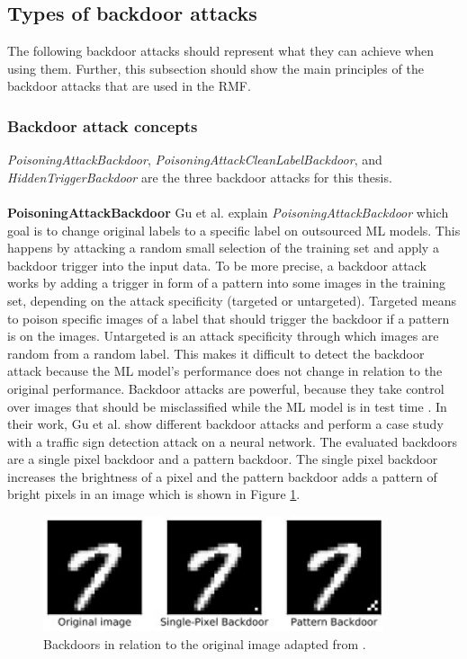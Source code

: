 \subsection{Types of backdoor attacks}
\label{sec:backdoor_types}

The following backdoor attacks should represent what they can achieve when using them. Further, this subsection should show the main principles of the backdoor attacks that are used in the RMF.

\subsubsection*{Backdoor attack concepts}

\textit{PoisoningAttackBackdoor}, \textit{PoisoningAttackCleanLabelBackdoor}, and \textit{HiddenTriggerBackdoor} are the three backdoor attacks for this thesis. \\ \\
\textbf{PoisoningAttackBackdoor} Gu et al. \cite{DBLP:journals/corr/abs-1708-06733} explain \textit{PoisoningAttackBackdoor} which goal is to change original labels to a specific label on outsourced ML models. This happens by attacking a random small selection of the training set and apply a backdoor trigger into the input data. To be more precise, a backdoor attack works by adding a trigger in form of a pattern into some images in the training set, depending on the attack specificity (targeted or untargeted). Targeted means to poison specific images of a label that should trigger the backdoor if a pattern is on the images. Untargeted is an attack specificity through which images are random from a random label. This makes it difficult to detect the backdoor attack because the ML model's performance does not change in relation to the original performance. Backdoor attacks are powerful, because they take control over images that should be misclassified while the ML model is in test time \cite{turner2018clean}. In their work, Gu et al. show different backdoor attacks and perform a case study with a traffic sign detection attack on a neural network. The evaluated backdoors are a single pixel backdoor and a pattern backdoor. The single pixel backdoor increases the brightness of a pixel and the pattern backdoor adds a pattern of bright pixels in an image which is shown in Figure \ref{fig:backdoor_pattern}.

\begin{figure}[ht!]
  \centering
  \includegraphics[width=10cm]{pictures/backdoor_pattern_bad_net.jpg}
  \caption{Backdoors in relation to the original image adapted from \cite{DBLP:journals/corr/abs-1708-06733}.}
  \label{fig:backdoor_pattern}
\end{figure}

